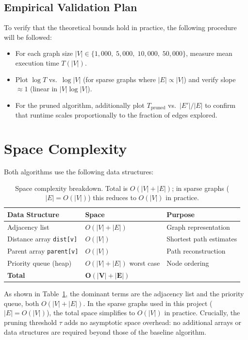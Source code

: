 \subsection{Empirical Validation Plan}

To verify that the theoretical bounds hold in practice, the following procedure will be followed:
\begin{itemize}
    \item For each graph size $|V| \in \{1{,}000,\;5{,}000,\;10{,}000,\;50{,}000\}$, measure mean execution time $T(|V|)$.
    \item Plot $\log T$ vs.\ $\log|V|$ (for sparse graphs where $|E| \propto |V|$) and verify slope $\approx 1$ (linear in $|V|\log|V|$).
    \item For the pruned algorithm, additionally plot $T_{\text{pruned}}$ vs.\ $|E'|/|E|$ to confirm that runtime scales proportionally to the fraction of edges explored.
\end{itemize}

\section{Space Complexity}

Both algorithms use the following data structures:

\begin{table}[h!]
\centering
\renewcommand{\arraystretch}{1.3}
\begin{tabular}{@{}lll@{}}
\toprule
\textbf{Data Structure} & \textbf{Space} & \textbf{Purpose} \\
\midrule
Adjacency list & $O(|V|+|E|)$ & Graph representation \\
Distance array \texttt{dist[v]} & $O(|V|)$ & Shortest path estimates \\
Parent array \texttt{parent[v]} & $O(|V|)$ & Path reconstruction \\
Priority queue (heap) & $O(|V|+|E|)$ worst case & Node ordering \\
\midrule
\textbf{Total} & $\mathbf{O(|V|+|E|)}$ & \\
\bottomrule
\end{tabular}
\caption[Space complexity breakdown]{Space complexity breakdown. Total is $O(|V|+|E|)$; in sparse graphs ($|E|=O(|V|)$) this reduces to $O(|V|)$ in practice.}
\label{table:space_complexity}
\end{table}

As shown in Table~\ref{table:space_complexity}, the dominant terms are the adjacency list and the priority queue, both $O(|V|+|E|)$. In the sparse graphs used in this project ($|E|=O(|V|)$), the total space simplifies to $O(|V|)$ in practice. Crucially, the pruning threshold $\tau$ adds no asymptotic space overhead: no additional arrays or data structures are required beyond those of the baseline algorithm.

